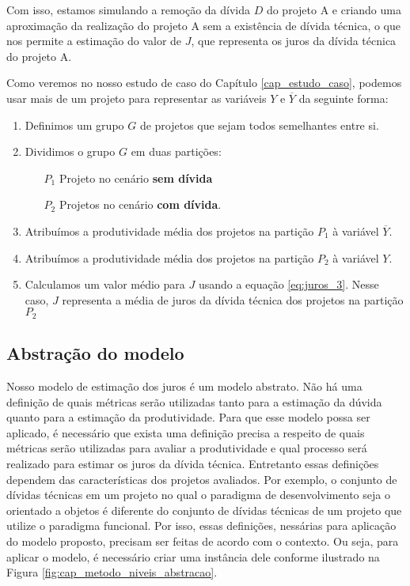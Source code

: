 Com isso, estamos simulando a remoção da dívida $D$ do projeto A e criando uma aproximação da realização do projeto A sem a existência de dívida técnica, o que nos permite a estimação do valor de $J$, que representa os juros da dívida técnica do projeto A.

Como veremos no nosso estudo de caso do Capítulo \ref{cap_estudo_caso}, podemos usar mais de um projeto para representar as variáveis $Y$  e  $\overline{Y}$ da seguinte forma:

\begin{enumerate}
\item Definimos um grupo $G$ de projetos que sejam todos semelhantes entre si.
\item Dividimos o grupo $G$ em duas partições: 
\begin{enumerate}
\item[$P_1$] Projeto no cenário \textbf{sem dívida}
\item[$P_2$] Projetos no cenário \textbf{com dívida}.
\end{enumerate}
\item Atribuímos a produtividade média dos projetos na partição $P_1$ à variável $\overline{Y}$.
\item Atribuímos a produtividade média dos projetos na partição $P_2$ à variável $Y$.
\item Calculamos um valor médio para $J$ usando a equação \ref{eq:juros_3}. Nesse caso, $J$ representa a média de juros da dívida técnica dos projetos na partição $P_2$
\end{enumerate}
 
 \subsection{Abstração do modelo}
 
Nosso modelo de estimação dos juros é um modelo abstrato.  Não há uma definição de quais métricas serão utilizadas tanto para a estimação da dúvida quanto para a estimação da produtividade.  Para que esse modelo possa ser aplicado, é necessário que exista uma definição precisa a respeito de quais métricas serão utilizadas para avaliar a produtividade e qual processo será realizado para estimar os juros da dívida técnica.  Entretanto essas definições dependem das características dos projetos avaliados. Por exemplo, o conjunto de dívidas técnicas em um projeto no qual o paradigma de desenvolvimento seja o orientado a objetos é diferente do conjunto de dívidas técnicas de um projeto que utilize o paradigma funcional. Por isso, essas definições, nessárias para aplicação do modelo proposto, precisam ser feitas de acordo com o contexto. Ou seja, para aplicar o modelo, é necessário criar uma instância dele conforme ilustrado na Figura \ref{fig:cap_metodo_niveis_abstracao}.


